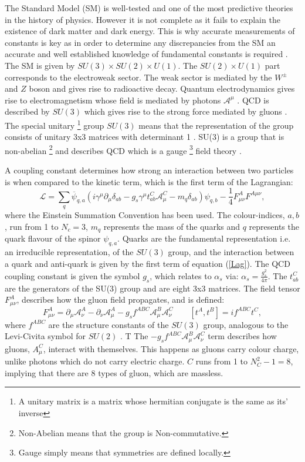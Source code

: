 \documentclass[12pt, onecolumn, nofootinbib]{revtex4}    %
\begin{document}
The Standard Model (SM) is well-tested and one of the most predictive theories in the history of physics. However it is not complete as it fails to explain the existence of dark matter and dark energy. This is why accurate measurements of constants is  key as in order to determine any discrepancies from the SM an accurate and well established knowledge of fundamental constants is required \cite{PHD}. The SM is given by ${SU(3)\times SU(2) \times U(1)}$. The ${SU(2) \times U(1)}$ part corresponds to the electroweak sector. The weak sector is mediated by the ${W^\pm}$ and ${Z}$ boson and gives rise to radioactive decay. Quantum electrodynamics gives rise to electromagnetism whose field is mediated by photons ${\mathcal{A}^\mu}$ \cite{PHD}. QCD is described by ${SU(3)}$ which gives rise to the strong force mediated by gluons \cite{PPB}. The special unitary \footnote{A unitary matrix is a matrix whose hermitian conjugate is the same as its' inverse} group ${SU(3)}$  means that the representation of the group consists of unitary 3x3 matrices with determinant 1 \cite{GROUP}.  SU(3) is a group that is non-abelian \footnote{Non-Abelian means that the group is Non-commutative.} and describes QCD which is a gauge \footnote{Gauge simply means that symmetries are defined locally.} field theory \cite{BOOK}. 

A coupling constant determines how strong an interaction between two particles is when compared to the kinetic term, which is the first term of the Lagrangian: \begin{equation} \label{Lag} \mathcal{L} = \sum_ {q} \overline{\psi}_{q,a} (i\gamma^\mu \partial_\mu \delta_{ab} - g_s \gamma^\mu t_{ab}^C \mathcal{A}_\mu^C  - m_q\delta_{ab})\psi_{q,b} - \frac{1}{4} F_{\mu\nu}^A F^{A \mu\nu}, \end{equation} where the Einstein Summation Convention has been used. The colour-indices, $a,b$, run from 1 to  ${N_c = 3}$, ${m_q}$ represents the mass of the quarks and ${q}$ represents the quark flavour of the spinor $\psi_{q,a}$. Quarks are the fundamental representation i.e. an irreducible representation, of the ${SU(3)}$ group, and the interaction between a quark and anti-quark is given by the first term of equation (\ref{Lag}). The QCD coupling constant is given the symbol ${g_s}$, which relates to ${\alpha_s}$ via: ${\alpha_s = \frac{g_s^2}{4\pi}.}$ The ${t_{ab}^C}$ are the generators of the SU(3) group and are eight 3x3 matrices. The field tensor ${F_{\mu\nu}^A}$, describes how the gluon field propagates, and is defined: \begin{equation}F_{\mu\nu}^A  = \partial_\mu \mathcal{A}_\nu^A  - \partial_\nu \mathcal{A}_\mu^A - g_s f^{ABC} \mathcal{A}_\mu^B \mathcal{A}_\nu^C  \qquad [t^A,t^B] = if^{ABC}t^C,  \end{equation} where ${f^{ABC}}$ are the structure constants of the ${SU(3)}$ group, analogous to the Levi-Civita symbol for ${SU(2)}$ \cite{PPB}. T The ${- g_s f^{ABC} \mathcal{A}_\mu^B \mathcal{A}_\nu^C}$ term describes how gluons, ${A_\mu^C}$, interact with themselves. This happens as gluons carry colour charge, unlike photons which do not carry electric charge. ${C}$ runs from 1 to ${N_C^2 -1 = 8}$, implying that there are 8 types of gluon, which are massless. 
\end{document}
